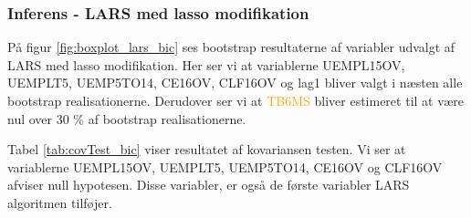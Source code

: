 

\subsubsection{Inferens - LARS med lasso modifikation}
På figur \ref{fig:boxplot_lars_bic} ses bootstrap resultaterne af variabler udvalgt af LARS med lasso modifikation. 
Her ser vi at variablerne \textcolor{blue3}{UEMPL15OV}, \textcolor{blue3}{UEMPLT5}, \textcolor{blue3}{UEMP5TO14}, \textcolor{blue3}{CE16OV}, \textcolor{blue3}{CLF16OV} og \textcolor{blue3}{lag1} bliver valgt i næsten alle bootstrap realisationerne. Derudover ser vi at \textcolor{orange}{TB6MS} bliver estimeret til at være nul over 30 \% af bootstrap realisationerne. 

Tabel \ref{tab:covTest_bic} viser resultatet af  kovariansen testen. Vi ser at variablerne \textcolor{blue3}{UEMPL15OV}, \textcolor{blue3}{UEMPLT5}, \textcolor{blue3}{UEMP5TO14}, \textcolor{blue3}{CE16OV} og \textcolor{blue3}{CLF16OV} afviser null hypotesen. Disse variabler, er også de første variabler LARS algoritmen tilføjer.  



